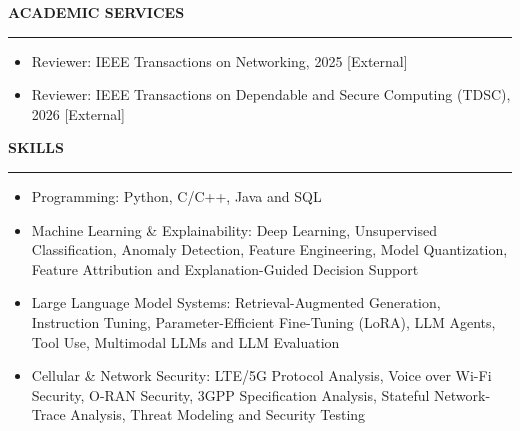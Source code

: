\documentclass[11pt,letterpaper]{article}
\makeatletter
\def\sectionlineskip{\medskip}%
\def\sectionskip{\medskip}    %
\newenvironment{rSection}[1]{%
  \sectionskip
  \MakeUppercase{\bf #1} %
  \par\nobreak            %
  \sectionlineskip
  \nobreak
  \hrule %
  \nobreak
  \@beginparpenalty\@M    %
  \begin{list}{}{%
    \setlength{\leftmargin}{1.5em} %
  }
  \item[]
}{%
  \end{list}
}
\makeatother
\begin{document}
\begin{rSection}{Academic Services}
\itemsep -3pt
\begin{itemize}
\item Reviewer: IEEE Transactions on Networking, 2025 [External]
\item Reviewer: IEEE Transactions on Dependable and Secure Computing (TDSC), 2026 [External]
\end{itemize}

\end{rSection}


\begin{rSection}{Skills}
\itemsep -3pt
\begin{itemize}
\item Programming: Python, C/C++, Java and SQL
\item Machine Learning \& Explainability: Deep Learning, Unsupervised Classification, Anomaly Detection, Feature Engineering, Model Quantization, Feature Attribution and Explanation-Guided Decision Support
\item Large Language Model Systems: Retrieval-Augmented Generation, Instruction Tuning, Parameter-Efficient Fine-Tuning (LoRA), LLM Agents, Tool Use, Multimodal LLMs and LLM Evaluation
\item Cellular \& Network Security: LTE/5G Protocol Analysis, Voice over Wi-Fi Security, O-RAN Security, 3GPP Specification Analysis, Stateful Network-Trace Analysis, Threat Modeling and Security Testing
\end{itemize}

\end{rSection}
\end{document}
